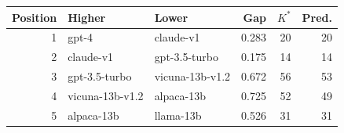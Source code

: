 \begin{tabular}{rllrrr}
\toprule
Position & Higher & Lower & Gap & $K^*$ & Pred. \\
\midrule
1 & gpt-4 & claude-v1 & 0.283 & 20 & 20 \\
2 & claude-v1 & gpt-3.5-turbo & 0.175 & 14 & 14 \\
3 & gpt-3.5-turbo & vicuna-13b-v1.2 & 0.672 & 56 & 53 \\
4 & vicuna-13b-v1.2 & alpaca-13b & 0.725 & 52 & 49 \\
5 & alpaca-13b & llama-13b & 0.526 & 31 & 31 \\
\bottomrule
\end{tabular}
